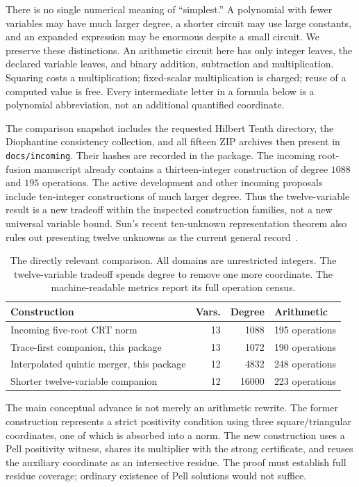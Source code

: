 \documentclass[11pt,a4paper]{article}
\theoremstyle{definition}\newtheorem{definition}[theorem]{Definition}
\theoremstyle{remark}\newtheorem{remark}[theorem]{Remark}
\numberwithin{equation}{section}
\begin{document}
There is no single numerical meaning of ``simplest.'' A polynomial with
fewer variables may have much larger degree, a shorter circuit may use
large constants, and an expanded expression may be enormous despite a
small circuit. We preserve these distinctions. An arithmetic circuit here
has only integer leaves, the declared variable leaves, and binary
addition, subtraction and multiplication. Squaring costs a multiplication;
fixed-scalar multiplication is charged; reuse of a computed value is free.
Every intermediate letter in a formula below is a polynomial abbreviation,
not an additional quantified coordinate.

The comparison snapshot includes the requested Hilbert Tenth directory,
the Diophantine consistency collection, and all fifteen ZIP archives then
present in \texttt{docs/incoming}. Their hashes are recorded in the package.
The incoming root-fusion manuscript already contains a thirteen-integer
construction of degree $1088$ and $195$ operations. The active development
and other incoming proposals include ten-integer constructions of much
larger degree. Thus the twelve-variable result is a new tradeoff within
the inspected construction families, not a new universal variable bound.
Sun's recent ten-unknown representation theorem also rules out presenting
twelve unknowns as the current general record~\cite{sun2026}.

\begin{table}[ht]\centering
\begin{tabular}{lrrl}\toprule
Construction & Vars. & Degree & Arithmetic\\\midrule
Incoming five-root CRT norm &13&1088&195 operations\\
Trace-first companion, this package &13&1072&190 operations\\
Interpolated quintic merger, this package &12&4832&248 operations\\
Shorter twelve-variable companion &12&16000&223 operations\\
\bottomrule\end{tabular}
\caption{The directly relevant comparison. All domains are unrestricted
integers. The twelve-variable tradeoff spends degree to remove one more
coordinate. The machine-readable metrics report its full operation census.}
\end{table}

The main conceptual advance is not merely an arithmetic rewrite. The
former construction represents a strict positivity condition using three
square/triangular coordinates, one of which is absorbed into a norm. The
new construction uses a Pell positivity witness, shares its multiplier
with the strong certificate, and reuses the auxiliary coordinate as an
intersective residue. The proof must establish full residue coverage;
ordinary existence of Pell solutions would not suffice.
\end{document}
